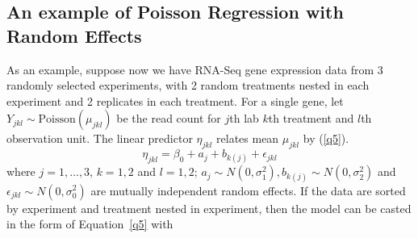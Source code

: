 	\subsection{An example of Poisson Regression with Random Effects}\label{poisson}
	As an example, suppose now we have RNA-Seq gene expression data from 3 randomly selected experiments, with 2 random treatments nested in each experiment and 2 replicates in each treatment. For a single gene, let $Y_{jkl}\sim \text{Poisson}(\mu_{jkl})$ be the read count for $j$th lab $k$th treatment and $l$th observation unit. The linear predictor $\eta_{jkl}$ relates mean $\mu_{jkl}$ by (\ref{q5}).  
		\begin{equation}\label{q6}
			\eta_{jkl} = \beta_0 + a_{j} + b_{k(j)} + \epsilon_{jkl}
		\end{equation}
	where $j=1, \ldots,  3$, $k=1, 2$ and $l=1, 2$; $a_j \sim N(0, \sigma_1^2), b_{k(j)}\sim N(0, \sigma_2^2)$ and $\epsilon_{jkl}\sim N(0, \sigma_0^2)$ are mutually independent random effects. If the data are sorted by experiment and treatment nested in experiment, then the model can be casted in the form of Equation~\ref{q5} with
